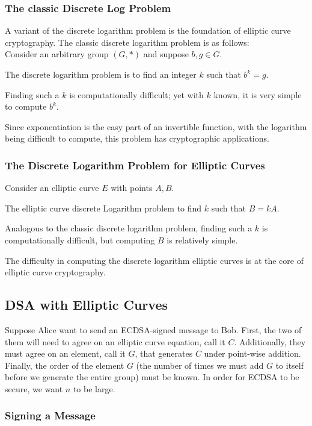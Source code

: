 \subsubsection{The classic Discrete Log Problem}
A variant of the discrete logarithm problem is the foundation of elliptic
curve cryptography.  The classic discrete logarithm problem is as follows:\\

Consider an arbitrary group $(G, *)$ and suppose $b,g \in G$.

The discrete logarithm problem is to find an integer $k$
such that $b^k = g$.

Finding such a $k$ is computationally difficult; yet
with $k$ known, it is very simple to compute $b^k$.

Since exponentiation is the easy part of an invertible function, with
the logarithm being difficult to compute, this problem has cryptographic
applications.


\subsubsection{The Discrete Logarithm Problem for Elliptic Curves}

Consider an elliptic curve $E$ with points $A,B$.

The elliptic curve discrete Logarithm problem to find $k$
such that $B = kA$.

Analogous to the classic discrete logarithm problem, finding such a $k$
is computationally difficult, but computing $B$ is relatively simple.

The difficulty in computing the discrete logarithm elliptic curves is at the core
of elliptic curve cryptography.

\subsection{DSA with Elliptic Curves}

Suppose Alice want to send an ECDSA-signed message to Bob.
First, the two of them will need to agree on an elliptic curve equation, call it $C$.
Additionally, they must agree on an element, call it $G$, that generates $C$ under
point-wise addition.  Finally, the order of the element $G$ (the number of times we must add
$G$ to itself before we generate the entire group) must be known. In order for ECDSA to be
secure, we want $n$ to be large.


\subsubsection{Signing a Message}


